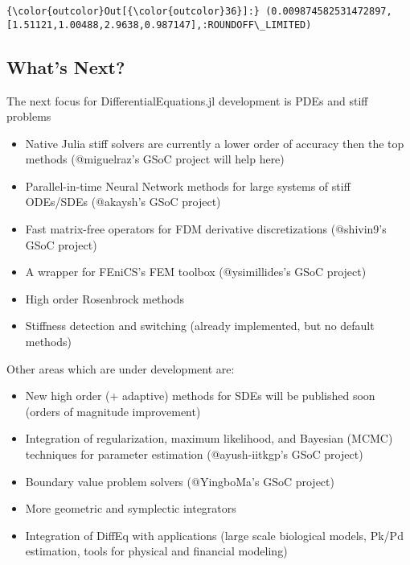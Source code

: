 \documentclass[11pt]{article}
\begin{document}
            \begin{Verbatim}[commandchars=\\\{\}]
{\color{outcolor}Out[{\color{outcolor}36}]:} (0.009874582531472897,[1.51121,1.00488,2.9638,0.987147],:ROUNDOFF\_LIMITED)
\end{Verbatim}
        
    \subsection{What's Next?}\label{whats-next}

The next focus for DifferentialEquations.jl development is PDEs and
stiff problems

\begin{itemize}
\itemsep1pt\parskip0pt
\item
  Native Julia stiff solvers are currently a lower order of accuracy
  then the top methods (@miguelraz's GSoC project will help here)
\item
  Parallel-in-time Neural Network methods for large systems of stiff
  ODEs/SDEs (@akaysh's GSoC project)
\item
  Fast matrix-free operators for FDM derivative discretizations
  (@shivin9's GSoC project)
\item
  A wrapper for FEniCS's FEM toolbox (@ysimillides's GSoC project)
\item
  High order Rosenbrock methods
\item
  Stiffness detection and switching (already implemented, but no default
  methods)
\end{itemize}

    Other areas which are under development are:

\begin{itemize}
\itemsep1pt\parskip0pt
\item
  New high order (+ adaptive) methods for SDEs will be published soon
  (orders of magnitude improvement)
\item
  Integration of regularization, maximum likelihood, and Bayesian (MCMC)
  techniques for parameter estimation (@ayush-iitkgp's GSoC project)
\item
  Boundary value problem solvers (@YingboMa's GSoC project)
\item
  More geometric and symplectic integrators
\item
  Integration of DiffEq with applications (large scale biological
  models, Pk/Pd estimation, tools for physical and financial modeling)
\end{itemize}


    
    
    
    
\end{document}
